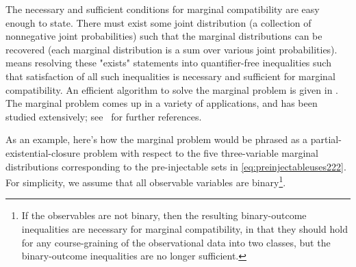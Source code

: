 The necessary and sufficient conditions for marginal compatibility are easy enough to state. There must exist some joint distribution (a collection of nonnegative joint probabilities) such that the marginal distributions can be recovered (each marginal distribution is a sum over various joint probabilities).  means resolving these "exists" statements into quantifier-free inequalities such that satisfaction of all such inequalities is necessary and sufficient for marginal compatibility. An efficient algorithm to solve the marginal problem is given in . The marginal problem comes up in a variety of applications, and has been studied extensively; see~\cite{fritz2013marginal} for further references.

As an example, here's how the marginal problem would be phrased as a partial-existential-closure problem with respect to the five three-variable marginal distributions corresponding to the pre-injectable sets in \cref{eq:preinjectableuses222}. For simplicity, we assume that all observable variables are binary\footnote{If the observables are not binary, then the resulting  binary-outcome inequalities are necessary for marginal compatibility, in that they should hold for any course-graining of the observational data into two classes, but the binary-outcome inequalities are no longer sufficient.}.

